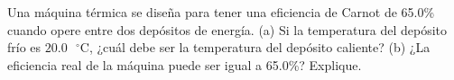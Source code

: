 \item Una máquina térmica se diseña para tener una eficiencia de Carnot de 65.0\% cuando opere entre dos depósitos de energía. (a) Si la temperatura del depósito frío es $20.0\text{ }^\circ\text{C}$, ¿cuál debe ser la temperatura del depósito caliente? (b) ¿La eficiencia real de la máquina puede ser igual a 65.0\%? Explique.
